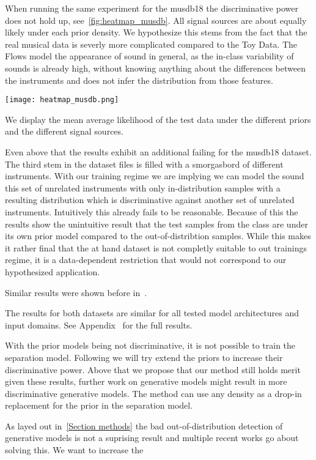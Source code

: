 When running the same experiment for the musdb18 the discriminative power does not hold up, see~\cref{fig:heatmap_musdb}. All signal sources are about equally likely under each prior density. We hypothesize this stems from the fact that the real musical data is severly more complicated compared to the Toy Data. The Flows model the appearance of sound in general, as the in-class variability of sounds is already high, without knowing anything about the  differences between the instruments and does not infer the distribution from those features.

\begin{marginfigure}
    \texttt{[image: heatmap\_musdb.png]}%
    \caption{We display the mean average likelihood of the test data under the different priors and the different signal sources.}%
    \label{fig:heatmap_musdb}
\end{marginfigure}

Even above that the results exhibit an additional failing for the musdb18 dataset. The third stem in the dataset files  is filled with a smorgasbord of different instruments. With our training regime we are implying we can model the sound this set of unrelated instruments with only in-distribution samples with a resulting distribution which is discriminative against another set of unrelated instruments. Intuitively this already fails to be reasonable. Because of this the results show the unintuitive result that the test samples from the  class are  under its own prior model compared to the out-of-distribtion samples. While this makes it rather final that the at hand dataset is not completly suitable to out trainings regime, it is a data-dependent restriction that would not correspond to our hypothesized application.

Similar results were shown before in~.

The results for both datasets are similar for all tested model architectures and input domains. See Appendix~ for the full results.

With the prior models being not discriminative, it is not possible to train the separation model. Following we will try extend the priors to increase their discriminative power. Above that we propose that our method still holds merit given these results, further work on generative models might result in more discriminative generative models. The method can use any density as a drop-in replacement for the prior in the separation model.

As layed out in~\ref{Section methods} the bad out-of-distribution detection of generative models is not a suprising result and multiple recent works go about solving this. We want to increase the
